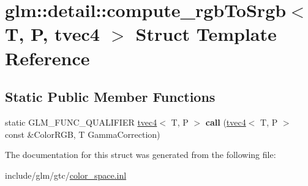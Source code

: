 \hypertarget{structglm_1_1detail_1_1compute__rgbToSrgb_3_01T_00_01P_00_01tvec4_01_4}{}\section{glm\+:\+:detail\+:\+:compute\+\_\+rgb\+To\+Srgb$<$ T, P, tvec4 $>$ Struct Template Reference}
\label{structglm_1_1detail_1_1compute__rgbToSrgb_3_01T_00_01P_00_01tvec4_01_4}
\subsection*{Static Public Member Functions}
\begin{DoxyCompactItemize}
\item 
\mbox{\label{structglm_1_1detail_1_1compute__rgbToSrgb_3_01T_00_01P_00_01tvec4_01_4_ae56f0243296dfc80da17770e0cab5edf}} 
static G\+L\+M\+\_\+\+F\+U\+N\+C\+\_\+\+Q\+U\+A\+L\+I\+F\+I\+ER \hyperlink{structglm_1_1tvec4}{tvec4}$<$ T, P $>$ {\bfseries call} (\hyperlink{structglm_1_1tvec4}{tvec4}$<$ T, P $>$ const \&Color\+R\+GB, T Gamma\+Correction)
\end{DoxyCompactItemize}


The documentation for this struct was generated from the following file\+:\begin{DoxyCompactItemize}
\item 
include/glm/gtc/\hyperlink{gtc_2color__space_8inl}{color\+\_\+space.\+inl}\end{DoxyCompactItemize}
